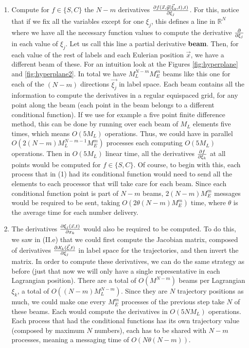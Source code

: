 \documentclass[11pt, a4paper]{article} %
\newcommand{\R}{\mathbb{R}} %
\newcommand{\x}{\mathcal{X}}
\begin{document}
\begin{enumerate}
\begin{enumerate}
\item Compute for $f\in\{S,C\}$ the $N-m$ derivatives $\pdv{f(\vec{x},\vec{y}(\vec{\xi}_y,t),t)}{\xi_j}$. For this, notice that if we fix all the variables except for one $\xi_j$, this defines a line in $\R^N$ where we have all the necessary function values to compute the derivative $\pdv{}{\xi_j}$ in each value of $\xi_j$. Let us call this line a partial derivative {\bf beam}. Then, for each value of the rest of labels and each Eulerian position $\vec{x}$, we have a different beam of these. For an intuition look at the Figures \ref{fig:hyperplane} and \ref{fig:hyperplane2}. In total we have $M_L^{N-m}M_E^m$ beams like this one for each of the $(N-m)$ directions $\vec{\xi_j}$ in label space. Each beam contains all the information to compute the derivatives in a regular equispaced grid, for any point along the beam (each point in the beam belongs to a different conditional function). If we use for example a five point finite difference method, this can be done by running over each beam of $M_L$ elements five times, which means $O(5M_L)$ operations. Thus, we could have in parallel $O(2(N-m)M_L^{N-m-1}M_E^m)$ processes each computing $O(5M_L)$ operations. Then in $O(5M_L)$ linear time, all the derivatives $\pdv{f}{\xi_k}$ at all points would be computed for $f\in\{S,C\}$. Of course, to begin with this, each process that in (1) had its conditional function would need to send all the elements to each processor that will take care for each beam. Since each conditional function point is part of $N-m$ beams, $2(N-m)M_E^m$ messages would be required to be sent, taking $O(2\theta (N-m)M_E^m)$ time, where $\theta$ is the average time for each number delivery.\\

\item The derivatives $\pdv{\xi_j(\vec{x},t)}{x_k}$ would also be required to be computed. To do this, we saw in (II.e) that we could first compute the Jacobian matrix, composed of derivatives $\pdv{\x_k(\vec{\xi},t)}{\xi_j}$ in label space for the trajectories, and then invert the matrix. In order to compute these derivatives, we can do the same strategy as before (just that now we will only have a single representative in each Lagrangian position). There are a total of $O(M^{N-m})$ beams per Lagrangian $\xi_k$, a total of $O((N-m)M_L^{N-m})$. Since they are $N$ trajectory positions as much, we could make one every $M_E^m$ processes of the previous step take $N$ of these beams. Each would compute the derivatives in $O(5NM_L)$ operations. Each process that had the conditional functions has its own trajectory value (composed by maximum $N$ numbers), each has to be shared with $N-m$ processes, meaning a messaging time of $O(N\theta (N-m))$.\\


\end{enumerate}
\end{enumerate}
\end{document}
